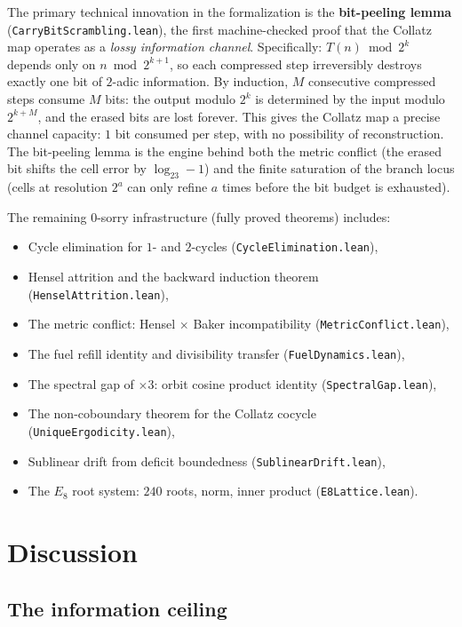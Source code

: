 \documentclass{CUP-JNL-FMP}%
\theoremstyle{definition}
\numberwithin{equation}{section}
\newcommand{\logb}{\log_2}
\begin{document}
The primary technical innovation in the formalization is the \textbf{bit-peeling
lemma} (\texttt{CarryBitScrambling.lean}), the first machine-checked proof that
the Collatz map operates as a \emph{lossy information channel}. Specifically:
$T(n) \bmod 2^k$ depends only on $n \bmod 2^{k+1}$, so each compressed step
irreversibly destroys exactly one bit of $2$-adic information. By induction, $M$
consecutive compressed steps consume $M$ bits: the output modulo $2^k$ is
determined by the input modulo $2^{k+M}$, and the erased bits are lost forever.
This gives the Collatz map a precise channel capacity: $1$ bit consumed per step,
with no possibility of reconstruction. The bit-peeling lemma is the engine behind
both the metric conflict (the erased bit shifts the cell error by $\logb 3 - 1$)
and the finite saturation of the branch locus (cells at resolution $2^a$ can only
refine $a$ times before the bit budget is exhausted).

The remaining $0$-sorry infrastructure (fully proved theorems) includes:
\begin{itemize}
  \item Cycle elimination for $1$- and $2$-cycles (\texttt{CycleElimination.lean}),
  \item Hensel attrition and the backward induction theorem (\texttt{HenselAttrition.lean}),
  \item The metric conflict: Hensel $\times$ Baker incompatibility (\texttt{MetricConflict.lean}),
  \item The fuel refill identity and divisibility transfer (\texttt{FuelDynamics.lean}),
  \item The spectral gap of $\times 3$: orbit cosine product identity (\texttt{SpectralGap.lean}),
  \item The non-coboundary theorem for the Collatz cocycle (\texttt{UniqueErgodicity.lean}),
  \item Sublinear drift from deficit boundedness (\texttt{SublinearDrift.lean}),
  \item The $E_8$ root system: $240$ roots, norm, inner product (\texttt{E8Lattice.lean}).
\end{itemize}


\section{Discussion}\label{sec:discussion}

\subsection{The information ceiling}
\end{document}
